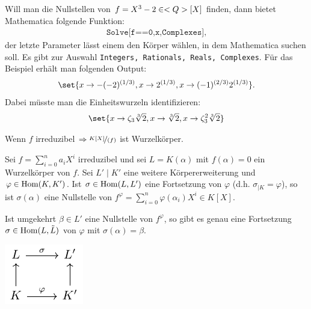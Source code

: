 \begin{mathematica}
	Will man die Nullstellen von $f = X^3 - 2 \in <Q>[X]$ finden, dann bietet Mathematica folgende Funktion:
	\begin{align*}
		\texttt{Solve[f==0,x,Complexes]},
	\end{align*}
	der letzte Parameter lässt einem den Körper wählen, in dem Mathematica suchen soll. Es gibt zur Auswahl \texttt{Integers, Rationals, Reals, Complexes}. Für das Beispiel erhält man folgenden Output:
	\begin{align*}
		\set{x \to -(-2)^{(1/3)}, x \to 2^{(1/3)}, x \to (-1)^{(2/3)} 2^{(1/3)}}.
	\end{align*}
	Dabei müsste man die Einheitswurzeln identifizieren:
	\begin{align*}
		\set{x \to \zeta_3\sqrt[3]{2}, x \to \sqrt[3]{2}, x \to \zeta_3^2 \sqrt[3]{2}}
	\end{align*}
\end{mathematica}
\begin{*anmerkung}
	Wenn $f$ irreduzibel $\Rightarrow \lnkset{K[X]}{(f)}$ ist Wurzelkörper.
\end{*anmerkung}
\begin{lemma}
	Sei $f = \sum_{i=0}^n a_i X^i$ irreduzibel und sei $L = K(\alpha)$ mit $f(\alpha)=0$ ein Wurzelkörper von $f$. Sei $L'\mid K'$ eine weitere Körpererweiterung und $\varphi \in \operatorname{Hom}(K,K')$. Ist $\sigma \in \operatorname{Hom}(L,L')$ eine Fortsetzung von $\varphi$ (d.h. $\sigma_{\mid K} = \varphi$), so ist $\sigma(\alpha)$ eine Nullstelle von $f^{\varphi}=\sum_{i=0}^n \varphi(\alpha_i)X^i \in K[X]$.
	
	Ist umgekehrt $\beta \in L' $ eine Nullstelle von $f^{\varphi}$, so gibt es genau eine Fortsetzung $\sigma \in \operatorname{Hom}(L,\tilde{L})$ von $\varphi$ mit $\sigma(\alpha) = \beta$.
\begin{center} %
	\includegraphics{./tikz/lemma_1_3_12.pdf}
\end{center}
\end{lemma}
